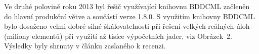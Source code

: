 Ve druhé polovině roku 2013 byl řešič využívající knihovnu BDDCML začleněn do 
hlavní produkční větve a součástí verze 1.8.0. S využitím knihovny BDDCML bylo 
dosaženo velmi dobré silné škálovatelnosti při řešení velkých reálných úloh 
(miliony elementů) při využití až tisíce výpočetních jader, viz Obrázek~2. 
Výsledky byly shrnuty v článku \cite{SistekBDDC} zaslaného k recenzi.
